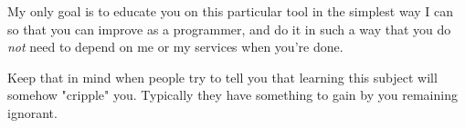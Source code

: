 My only goal is to educate you on this particular tool in the simplest way
I can so that you can improve as a programmer, and do it in such a way that
you do \emph{not} need to depend on me or my services when you're done.

Keep that in mind when people try to tell you that learning this subject will
somehow "cripple" you.  Typically they have something to gain by you remaining
ignorant.


